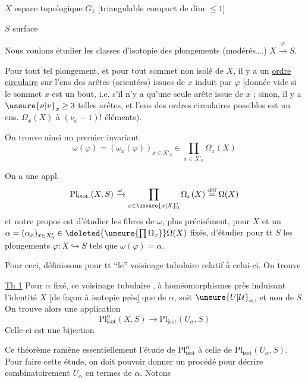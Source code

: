 $X$ espace topologique  $G_1$ [triangulable compact de dim $\leq1$]

$S$ surface 

Nous voulons étudier les classes d'isotopie des plongements (modérés\ldots.) $X\xrightarrow{\varphi}S$.

Pour tout tel plongement\inserted{$\varphi$}, et pour tout sommet   non isolé de $X$, il y a un \uline{ordre circulaire} sur l'ens des arêtes (orientées) issues de $x$ induit par $\varphi$  [donnée vide si le sommet $x$ est un bout, i.e. s'il n'y a qu'une seule arête issue de $x$ ; sinon, il y  a $\unsure{\nu|v}_x\geq3$ telles arêtes, et  l'ens des ordres circulaires possibles est un ens. $\Omega_x(X)$ à $(\nu_x-1)!$ éléments).

On trouve ainsi un premier invariant
\[
 \omega(\varphi)=(\omega_x(\varphi))_{x\in X'_0}\in\prod_{x\in X'_0}\Omega_x(X)
\]

On a une appl.
\[
 \mathrm{Pl}_{\mathrm{isot}.}(X,S)\xrightarrow{\omega}
 \prod_{x\in\unsure{x|X}'_0}\Omega_x(X)\overset{\text{déf}}{=}\Omega(X)
\]
et notre propos est d'étudier les fibres  de $\omega$, plus précisément, pour $X$ et un $\alpha=(\alpha_x)_{x\in X'_0}\in\deleted{\unsure{\prod\Omega_x}}\Omega(X)$ fixés, d'étudier pour tt $S$ les plongements $\varphi:X\hookrightarrow S$ tels que $\omega(\varphi)=\alpha$.

Pour ceci,  définissons pour tt  ``le'' voisinage tubulaire  relatif à celui-ci. On trouve

\uline{Th 1} Pour $\alpha$ fixé, ce voisinage tubulaire , à homéomorphismes près induisant l'identité $X$ [de façon  à isotopie près] que de $\alpha$, soit $\unsure{U|\mathcal U}_\alpha$, et non de $S$.  On trouve alors une application
\[
 \mathrm{Pl}_{\mathrm{isot}}^\alpha(X,S)\longrightarrow\mathrm{Pl}_{\mathrm{isot}}(U_\alpha,S)
\]
Celle-ci est une bijection

Ce théorème ramène essentiellement l'étude de $\mathrm{Pl}_{\mathrm{isot}}^\alpha$ à celle de $\mathrm{Pl}_{\mathrm{isot}}(U_\alpha,S)$. Pour faire cette étude, on doit pouvoir donner un procédé pour décrire combinatoirement $U_\alpha$ en termes de $\alpha$. Notons

